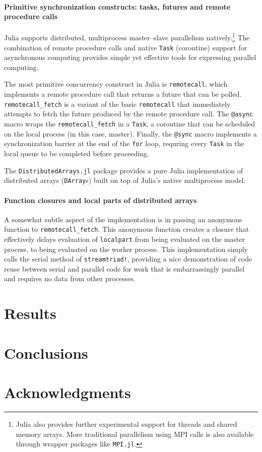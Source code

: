 \documentclass{article}
\begin{document}
\paragraph{Primitive synchronization constructs: tasks, futures and remote
procedure calls}
Julia supports distributed, multiprocess master--slave parallelism
natively.\footnote{Julia also provides further experimental support for threads
and shared memory arrays. More traditional parallelism using MPI calls is also
available through wrapper packages like \lstinline|MPI.jl|.}
The combination of remote procedure calls and native \lstinline|Task|
(coroutine) support for asynchronous computing provides simple yet effective
tools for expressing parallel computing.

The most primitive concurrency construct in Julia is \lstinline|remotecall|,
which implements a remote procedure call that returns a future that can be
polled. \lstinline|remotecall_fetch| is a variant of the basic
\lstinline|remotecall| that immediately attempts to fetch the future produced
by the remote procedure call. The \lstinline|@async| macro wraps the
\lstinline|remotecall_fetch| in a \lstinline|Task|, a coroutine that can be
scheduled on the local process (in this case, master). Finally, the
\lstinline|@sync| macro implements a synchronization barrier at the end of the
\lstinline|for| loop, requring every \lstinline|Task| in the local queue to be
completed before proceeding.

The \lstinline|DistributedArrays.jl| package provides a pure Julia
implementation of distributed arrays (\lstinline|DArray|s) built on top of
Julia's native multiprocess model. 

\paragraph{Function closures and local parts of distributed arrays}
A somewhat subtle aspect of the implementation is in passing an anonymous
function to \lstinline|remotecall_fetch|. This anonymous function creates a
closure that effectively delays evaluation of \lstinline|localpart| from being
evaluated on the master process, to being evaluated on the worker process.
This implementation simply calls the serial method of \lstinline|streamtriad!|,
providing a nice demonstration of code reuse between serial and parallel code
for work that is embarrassingly parallel and requires no data from other
processes.

\section{Results}

\section{Conclusions}

\section*{Acknowledgments}


\end{document}
